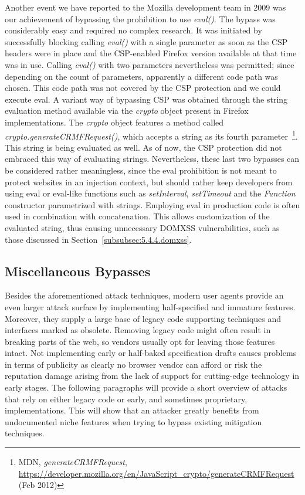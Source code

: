    Another event we have reported to the Mozilla development team in 2009 was our achievement of bypassing the prohibition to use \textit{eval()}. The bypass was considerably easy and required no complex research. It was initiated by successfully blocking calling \textit{eval()} with a single parameter as soon as the CSP headers were in place and the CSP-enabled Firefox version available at that time was in use. Calling \textit{eval()} with two parameters nevertheless was permitted; since depending on the count of parameters, apparently a different code path was chosen. 
    This code path was not covered by the CSP protection and we could execute eval.  A variant way of bypassing CSP was obtained through the string evaluation method available via the \textit{crypto} object present in Firefox implementations. The \textit{crypto} object features a method called \textit{crypto.generateCRMFRequest()}, which accepts a string as its fourth parameter~\footnote{MDN, \textit{generateCRMFRequest}, \url{https://developer.mozilla.org/en/JavaScript\_crypto/generateCRMFRequest} (Feb 2012)}. This string is being evaluated as well. As of now, the CSP protection did not embraced this way of evaluating strings. Nevertheless, these last two bypasses can be considered rather meaningless, since the eval prohibition is not meant to protect websites in an injection context, but should rather keep developers from using eval or eval-like functions such as \textit{setInterval}, \textit{setTimeout} and the \textit{Function} constructor parametrized with strings. Employing eval in production code is 
often used in combination with concatenation.
    This allows customization of the evaluated string, thus causing unnecessary DOMXSS vulnerabilities, such as those discussed in Section~\ref{subsubsec:5.4.4.domxss}. 

    \subsection{Miscellaneous Bypasses}
    \label{subsubsec:5.4.13.miscellaneous_bypasses}

   Besides the aforementioned attack techniques, modern user agents provide an even larger attack surface by implementing half-specified and immature features. Moreover, they supply a large base of legacy code supporting techniques and interfaces marked as obsolete. Removing legacy code might often result in breaking parts of the web, so vendors usually opt for leaving those features intact. Not implementing early or half-baked specification drafts causes problems in terms of publicity as clearly no browser vendor can afford or risk the reputation damage arising from the lack of support for cutting-edge technology in early stages. The following paragraphs will provide a short overview of attacks that rely on either legacy code or early, and sometimes proprietary, implementations. This will show that an attacker greatly benefits from undocumented niche features when trying to bypass existing mitigation techniques.
  
